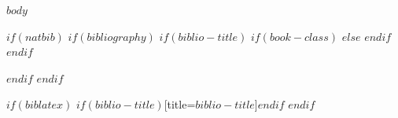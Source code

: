 \documentclass[
    $if(fontsize)$$fontsize$$else$10pt$endif$,
    $if(papersize)$$papersize$$else$letterpaper$endif$,
    titlepage,
    oneside,
    openright,
    $if(draft)$draft$else$final$endif$,
    article]{memoir}
\begin{document}

\mainmatter
$body$

\appendix

\backmatter

$if(natbib)$
    $if(bibliography)$
        $if(biblio-title)$
            $if(book-class)$
                \renewcommand\bibname{$biblio-title$}
            $else$
                \renewcommand\refname{$biblio-title$}
            $endif$
        $endif$
        
    $endif$
$endif$

$if(biblatex)$
    \printbibliography$if(biblio-title)$[title=$biblio-title$]$endif$
$endif$


\end{document}
